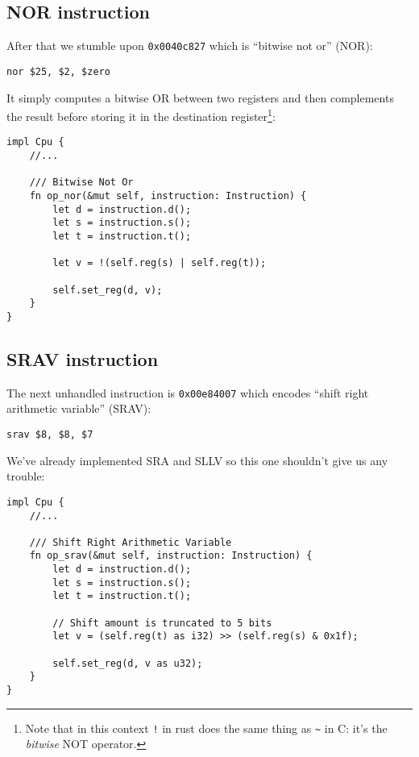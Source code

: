 \documentclass[a4paper]{article}
\newcommand{\code}[1] {\texttt{#1}}
\begin{document}
\subsection{NOR instruction}

After that we stumble upon \code{0x0040c827} which is ``bitwise not
or'' (NOR):

\begin{lstlisting}[language=assembly]
nor $25, $2, $zero
\end{lstlisting}

It simply computes a bitwise OR between two registers and then
complements the result before storing it in the destination
register\footnote{Note that in this context \code{!} in rust does the
  same thing as \code{\~{}} in C: it's the \emph{bitwise} NOT
  operator.}:

\begin{lstlisting}
impl Cpu {
    //...

    /// Bitwise Not Or
    fn op_nor(&mut self, instruction: Instruction) {
        let d = instruction.d();
        let s = instruction.s();
        let t = instruction.t();

        let v = !(self.reg(s) | self.reg(t));

        self.set_reg(d, v);
    }
}
\end{lstlisting}

\subsection{SRAV instruction}

The next unhandled instruction is \code{0x00e84007} which encodes
``shift right arithmetic variable'' (SRAV):

\begin{lstlisting}[language=assembly]
srav $8, $8, $7
\end{lstlisting}

We've already implemented SRA and SLLV so this one shouldn't give us
any trouble:

\begin{lstlisting}
impl Cpu {
    //...

    /// Shift Right Arithmetic Variable
    fn op_srav(&mut self, instruction: Instruction) {
        let d = instruction.d();
        let s = instruction.s();
        let t = instruction.t();

        // Shift amount is truncated to 5 bits
        let v = (self.reg(t) as i32) >> (self.reg(s) & 0x1f);

        self.set_reg(d, v as u32);
    }
}
\end{lstlisting}
\end{document}

